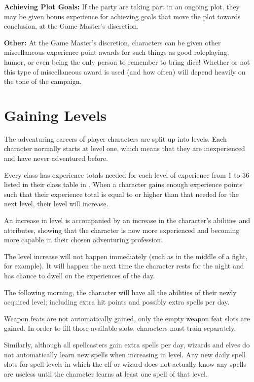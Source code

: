 \begin{multicols*}{2}
\textbf{Achieving Plot Goals:} If the party are taking part in an ongoing plot, they may be given bonus experience for achieving goals that move the plot towards conclusion, at the Game Master’s discretion.

\textbf{Other:} At the Game Master’s discretion, characters can be given other miscellaneous experience point awards for such things as good roleplaying, humor, or even being the only person to remember to bring dice! Whether or not this type of miscellaneous award is used (and how often) will depend heavily on the tone of the campaign.

\section{Gaining Levels}\label{sec:Gaining Levels}
The adventuring careers of player characters are split up into levels. Each character normally starts at level one, which means that they are inexperienced and have never adventured before. 

Every class has experience totals needed for each level of experience from 1 to 36 listed in their class table in . When a character gains enough experience points such that their experience total is equal to or higher than that needed for the next level, their level will increase.

An increase in level is accompanied by an increase in the character’s abilities and attributes, showing that the character is now more experienced and becoming more capable in their chosen adventuring profession.

The level increase will not happen immediately (such as in the middle of a fight, for example). It will happen the next time the character rests for the night and has chance to dwell on the experiences of the day.

The following morning, the character will have all the abilities of their newly acquired level; including extra hit points and possibly extra spells per day.

Weapon feats are not automatically gained, only the empty weapon feat slots are gained. In order to fill those available slots, characters must train separately.

Similarly, although all spellcasters gain extra spells per day, wizards and elves do not automatically learn new spells when increasing in level. Any new daily spell slots for spell levels in which the elf or wizard does not actually know any spells are useless until the character learns at least one spell of that level.
\end{multicols*}

